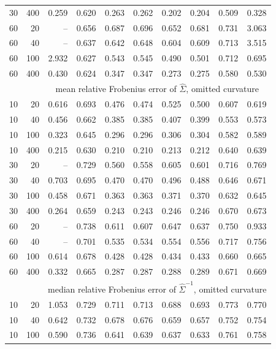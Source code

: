 \begin{tabular}{@{}rrrrrrrrrr@{}}
30 & 400 & 0.259 & 0.620 & 0.263 & 0.262 & 0.202 & 0.204 & 0.509 & 0.328 \\
60 & 20 & -- & 0.656 & 0.687 & 0.696 & 0.652 & 0.681 & 0.731 & 3.063 \\
60 & 40 & -- & 0.637 & 0.642 & 0.648 & 0.604 & 0.609 & 0.713 & 3.515 \\
60 & 100 & 2.932 & 0.627 & 0.543 & 0.545 & 0.490 & 0.501 & 0.712 & 0.695 \\
60 & 400 & 0.430 & 0.624 & 0.347 & 0.347 & 0.273 & 0.275 & 0.580 & 0.530 \\
\midrule
 & & \multicolumn{8}{c}{mean relative Frobenius error of $\hat\Sigma$, omitted curvature}\\
\midrule
10 & 20 & 0.616 & 0.693 & 0.476 & 0.474 & 0.525 & 0.500 & 0.607 & 0.619 \\
10 & 40 & 0.456 & 0.662 & 0.385 & 0.385 & 0.407 & 0.399 & 0.553 & 0.573 \\
10 & 100 & 0.323 & 0.645 & 0.296 & 0.296 & 0.306 & 0.304 & 0.582 & 0.589 \\
10 & 400 & 0.215 & 0.630 & 0.210 & 0.210 & 0.213 & 0.212 & 0.640 & 0.639 \\
30 & 20 & -- & 0.729 & 0.560 & 0.558 & 0.605 & 0.601 & 0.716 & 0.769 \\
30 & 40 & 0.703 & 0.695 & 0.470 & 0.470 & 0.496 & 0.488 & 0.646 & 0.671 \\
30 & 100 & 0.458 & 0.671 & 0.363 & 0.363 & 0.371 & 0.370 & 0.632 & 0.645 \\
30 & 400 & 0.264 & 0.659 & 0.243 & 0.243 & 0.246 & 0.246 & 0.670 & 0.673 \\
60 & 20 & -- & 0.738 & 0.611 & 0.607 & 0.647 & 0.637 & 0.750 & 0.933 \\
60 & 40 & -- & 0.701 & 0.535 & 0.534 & 0.554 & 0.556 & 0.717 & 0.756 \\
60 & 100 & 0.614 & 0.678 & 0.428 & 0.428 & 0.434 & 0.433 & 0.660 & 0.665 \\
60 & 400 & 0.332 & 0.665 & 0.287 & 0.287 & 0.288 & 0.289 & 0.671 & 0.669 \\
\midrule
 & & \multicolumn{8}{c}{median relative Frobenius error of $\hat\Sigma^{-1}$, omitted curvature}\\
\midrule
10 & 20 & 1.053 & 0.729 & 0.711 & 0.713 & 0.688 & 0.693 & 0.773 & 0.770 \\
10 & 40 & 0.642 & 0.732 & 0.678 & 0.676 & 0.659 & 0.657 & 0.752 & 0.754 \\
10 & 100 & 0.590 & 0.736 & 0.641 & 0.639 & 0.637 & 0.633 & 0.761 & 0.758 \\

\end{tabular}
